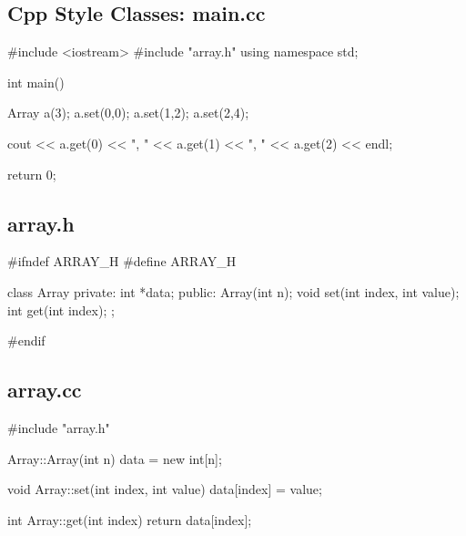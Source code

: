 
\begin{slide}
\section{Cpp Style Classes: main.cc}

\begin{cpp}
#include <iostream>
#include "array.h"
using namespace std;

int main() {
  Array a(3);
  a.set(0,0);
  a.set(1,2);
  a.set(2,4);

  cout << a.get(0) << ", " << a.get(1) << ", " << a.get(2) << endl;

  return 0;
}
\end{cpp}
\end{slide}


\begin{slide}
\section{array.h}

\begin{cpp}
#ifndef ARRAY_H
#define ARRAY_H

class Array {
private:
  int *data;
public:
  Array(int n);
  void set(int index, int value);
  int get(int index);
};

#endif
\end{cpp}
\end{slide}


\begin{slide}
\section{array.cc}
\begin{cpp}
#include "array.h"

Array::Array(int n) {
  data = new int[n];
}

void Array::set(int index, int value) {
  data[index] = value;
}

int Array::get(int index) {
  return data[index];
}
\end{cpp}

\end{slide}

